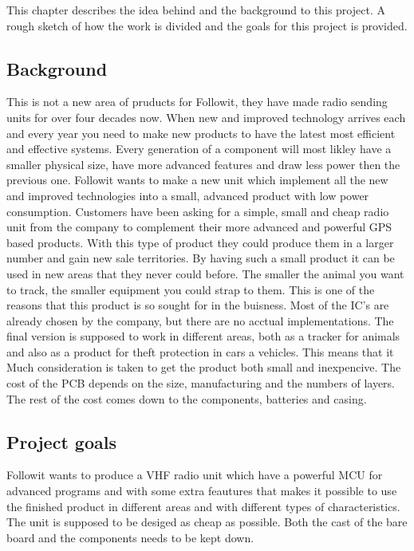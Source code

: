 This chapter describes the idea behind and the background to this project. A rough sketch of how the work is divided and the goals for this project is provided.

\subsection{Background}
This is not a new area of pruducts for Followit, they have made radio sending units for over four decades now.
When new and improved technology arrives each and every year you need to make new products to have the latest most efficient and effective systems. Every generation of a component will most likley have a smaller physical size, have more advanced features and draw less power then the previous one. Followit wants to make a new unit which implement all the new and improved technologies into a small, advanced product with low power consumption. 
Customers have been asking for a simple, small and cheap radio unit from the company to complement their more advanced and powerful GPS based products. With this type of product they could produce them in a larger number and gain new sale territories. By having such a small product it can be used in new areas that they never could before. The smaller the animal you want to track, the smaller equipment you could strap to them. This is one of the reasons that this product is so sought for in the buisness. Most of the \gls{IC}'s are already chosen by the company, but there are no acctual implementations. The final version is supposed to work in different areas, both as a tracker for animals and also as a product for theft protection in cars a vehicles. This means that it  Much consideration is taken to get the product both small and inexpencive. The cost of the PCB depends on the size, manufacturing and the numbers of layers. The rest of the cost comes down to the components, batteries and casing.    \\

\subsection{Project goals}
Followit wants to produce a VHF radio unit which have a powerful MCU for advanced programs and with some extra feautures that makes it possible to use the finished product in different areas and with different types of characteristics.
The unit is supposed to be desiged as cheap as possible.
Both the cast of the bare board and the components needs to be kept down.  


